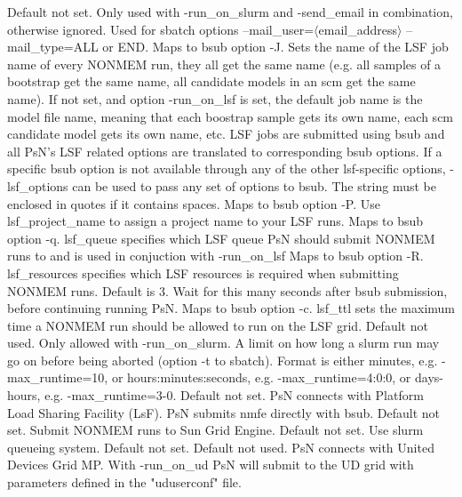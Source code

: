 \begin{optionlist}
Default not set. Only used with -run\_on\_slurm and -send\_email in combination, otherwise ignored. Used for sbatch options --mail\_user=$\langle$email\_address$\rangle$ --mail\_type=ALL or END.  
\nextopt
{}
Maps to bsub option -J. Sets the name of the LSF job name of every NONMEM run, they all get the same name (e.g. all samples of a bootstrap get the same name, all candidate models in an scm get the same name). If not set, and option -run\_on\_lsf is set, the default job name is the model file name, meaning that each boostrap sample gets its own name, each scm candidate model gets its own name, etc. 
\nextopt
{}
LSF jobs are submitted using bsub and all PsN's LSF related options are translated to corresponding bsub options. If a specific bsub option is not available through any of the other lsf-specific options, -lsf\_options can be used to pass any set of options to bsub. The string must be enclosed in quotes if it contains spaces. 
\nextopt
{}
Maps to bsub option -P. Use lsf\_project\_name to assign a project name to your LSF runs. 
\nextopt
{}
Maps to bsub option -q. lsf\_queue specifies which LSF queue PsN should submit NONMEM runs to and is used in conjuction with -run\_on\_lsf 
\nextopt
{}
Maps to bsub option -R. lsf\_resources specifies which LSF resources is required when submitting NONMEM runs. 
\nextopt
{}
Default is 3. Wait for this many seconds after bsub submission, before continuing running PsN. 
\nextopt
{}
Maps to bsub option -c. lsf\_ttl sets the maximum time a NONMEM run should be allowed to run on the LSF grid. 
\nextopt
{}
Default not used. Only allowed with -run\_on\_slurm. A limit on how long a slurm run may go on before being aborted (option -t to sbatch). Format is either minutes, e.g. -max\_runtime=10, or hours:minutes:seconds, e.g. -max\_runtime=4:0:0, or days-hours, e.g. -max\_runtime=3-0. 
\nextopt
{}
Default not set. PsN connects with Platform Load Sharing Facility (LsF). PsN submits nmfe directly with bsub. 
\nextopt
{}
Default not set. Submit NONMEM runs to Sun Grid Engine.
\nextopt
{}
Default not set. Use slurm queueing system.
\nextopt
{}
Default not set.  
\nextopt
{}
Default not used. PsN connects with United Devices Grid MP. With -run\_on\_ud PsN will submit to the UD grid with parameters defined in the "uduserconf" file. 

\end{optionlist}
